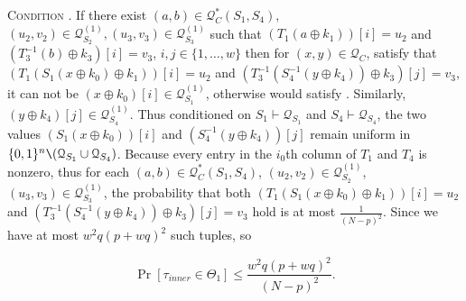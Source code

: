 \noindent \textsc{Condition \cone}. If there exist $(a, b) \in \mathcal{Q}_{C}^{*}\left(S_{1}, S_{4}\right)$, $(u_{2}, v_{2}) \in \mathcal{Q}_{S_{2}}^{(1)}, (u_{3}, v_{3}) \in \mathcal{Q}_{S_{3}}^{(1)}$ such that $\left(T_1\left(a \oplus k_{1}\right)\right)[i] = u_2$ and $\left(T_{3}^{-1}\left(b\right) \oplus k_{3}\right)[i] = v_3$, $i, j \in\{1, \ldots, w\}$ then for $(x, y) \in \mathcal{Q}_{C}$, satisfy that $\left(T_{1}\left(S_{1}\left(x \oplus k_{0}\right) \oplus k_{1}\right)\right)[i]=u_2$ and $\left(T_{3}^{-1}\left(S_{4}^{-1}\left(y \oplus k_{4}\right)\right) \oplus k_{3}\right)[j]=v_3$, it can not be $\left(x \oplus k_{0}\right)[i] \in \mathcal{Q}_{S_{1}}^{(1)}$, otherwise would satisfy \btwo. Similarly, $\left(y \oplus k_{4}\right)[j] \in \mathcal{Q}_{S_{4}}^{(1)}$. Thus conditioned on $S_{1} \vdash \mathcal{Q}_{S_{1}}$ and $S_{4} \vdash \mathcal{Q}_{S_{4}}$, the two values $\left(S_{1}\left(x \oplus k_{0}\right)\right)[i]$ and $\left(S_{4}^{-1}\left(y \oplus k_{4}\right)\right)[j]$  remain uniform in $\{0, 1\}^{n} \verb|\| (\mathcal{Q}_{S_{1}} \cup \mathcal{Q}_{S_{4}})$. Because every entry in the $i_{0}$th column of $T_{1}$ and $T_{4}$ is nonzero, thus for each $(a, b) \in \mathcal{Q}_{C}^{*}\left(S_{1}, S_{4}\right)$, $(u_{2}, v_{2}) \in \mathcal{Q}_{S_{2}}^{(1)}$, $(u_{3}, v_{3}) \in \mathcal{Q}_{S_{3}}^{(1)}$, the probability that both $\left(T_{1}\left(S_{1}\left(x \oplus k_{0}\right) \oplus k_{1}\right)\right)[i]=u_2$ and $\left(T_{3}^{-1}\left(S_{4}^{-1}\left(y \oplus k_{4}\right)\right) \oplus k_{3}\right)[j]=v_3$ hold is at most $\frac{1}{(N-p)^{2}}$. Since we have at most $w^{2} q (p+w q)^{2}$ such tuples, so

$$
\operatorname{Pr}\left[\tau_{inner} \in \Theta_{1}\right] \leq \frac{w^{2} q (p+w q)^{2}}{(N-p)^{2}}.
$$

